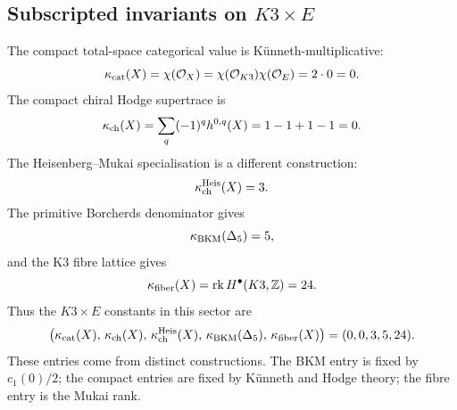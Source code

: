 \subsection*{Subscripted invariants on \(K3\times E\)}

The compact total-space categorical value is K\"unneth-multiplicative:
\[
  \kappa_{\mathrm{cat}}(X)
  =
  \chi(\mathcal O_X)
  =
  \chi(\mathcal O_{K3})\chi(\mathcal O_E)
  =
  2\cdot 0
  =
  0.
\]
The compact chiral Hodge supertrace is
\[
  \kappa_{\mathrm{ch}}(X)
  =
  \sum_q(-1)^q h^{0,q}(X)
  =
  1-1+1-1
  =
  0.
\]
The Heisenberg--Mukai specialisation is a different construction:
\[
  \kappa_{\mathrm{ch}}^{\mathrm{Heis}}(X)=3.
\]
The primitive Borcherds denominator gives
\[
  \kappa_{\mathrm{BKM}}(\Delta_{5})=5,
\]
and the K3 fibre lattice gives
\[
  \kappa_{\mathrm{fiber}}(X)=\operatorname{rk}H^\bullet(K3,\mathbb Z)=24.
\]
Thus the \(K3\times E\) constants in this sector are
\[
  \bigl(
    \kappa_{\mathrm{cat}}(X),\,
    \kappa_{\mathrm{ch}}(X),\,
    \kappa_{\mathrm{ch}}^{\mathrm{Heis}}(X),\,
    \kappa_{\mathrm{BKM}}(\Delta_{5}),\,
    \kappa_{\mathrm{fiber}}(X)
  \bigr)
  =
  (0,0,3,5,24).
\]
These entries come from distinct constructions. The BKM entry is fixed
by \(c_1(0)/2\); the compact entries are fixed by K\"unneth and Hodge
theory; the fibre entry is the Mukai rank.
